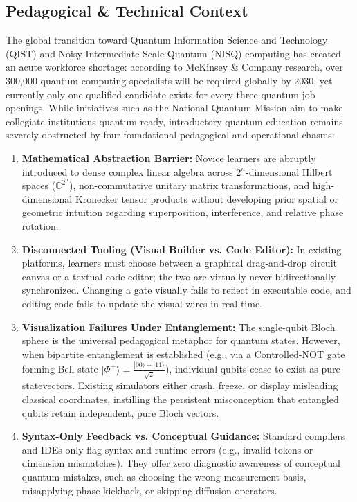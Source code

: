 \documentclass[11pt, a4paper]{article}
\begin{document}
\subsection{Pedagogical \& Technical Context}
The global transition toward Quantum Information Science and Technology (QIST) and Noisy Intermediate-Scale Quantum (NISQ) computing has created an acute workforce shortage: according to McKinsey \& Company research, over 300,000 quantum computing specialists will be required globally by 2030, yet currently only one qualified candidate exists for every three quantum job openings. While initiatives such as the National Quantum Mission aim to make collegiate institutions quantum-ready, introductory quantum education remains severely obstructed by four foundational pedagogical and operational chasms:
\begin{enumerate}[label=\textbf{\arabic*.}]
	\item \textbf{Mathematical Abstraction Barrier:} Novice learners are abruptly introduced to dense complex linear algebra across $2^n$-dimensional Hilbert spaces ($\mathbb{C}^{2^n}$), non-commutative unitary matrix transformations, and high-dimensional Kronecker tensor products without developing prior spatial or geometric intuition regarding superposition, interference, and relative phase rotation.
	\item \textbf{Disconnected Tooling (Visual Builder vs. Code Editor):} In existing platforms, learners must choose between a graphical drag-and-drop circuit canvas or a textual code editor; the two are virtually never bidirectionally synchronized. Changing a gate visually fails to reflect in executable code, and editing code fails to update the visual wires in real time.
	\item \textbf{Visualization Failures Under Entanglement:} The single-qubit Bloch sphere is the universal pedagogical metaphor for quantum states. However, when bipartite entanglement is established (e.g., via a Controlled-NOT gate forming Bell state $|\Phi^+\rangle = \frac{|00\rangle+|11\rangle}{\sqrt{2}}$), individual qubits cease to exist as pure statevectors. Existing simulators either crash, freeze, or display misleading classical coordinates, instilling the persistent misconception that entangled qubits retain independent, pure Bloch vectors.
	\item \textbf{Syntax-Only Feedback vs. Conceptual Guidance:} Standard compilers and IDEs only flag syntax and runtime errors (e.g., invalid tokens or dimension mismatches). They offer zero diagnostic awareness of conceptual quantum mistakes, such as choosing the wrong measurement basis, misapplying phase kickback, or skipping diffusion operators.

\end{enumerate}
\end{document}
